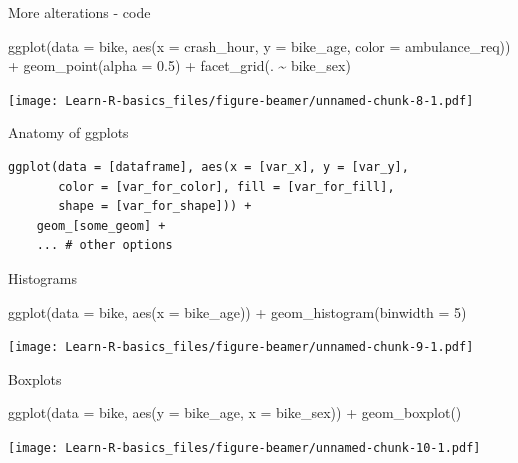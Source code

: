 \documentclass[
  ignorenonframetext,
]{beamer}
\newenvironment{Shaded}{\begin{snugshade}}{\end{snugshade}}
\newcommand{\AttributeTok}[1]{\textcolor[rgb]{0.77,0.63,0.00}{#1}}
\newcommand{\DecValTok}[1]{\textcolor[rgb]{0.00,0.00,0.81}{#1}}
\newcommand{\FloatTok}[1]{\textcolor[rgb]{0.00,0.00,0.81}{#1}}
\newcommand{\FunctionTok}[1]{\textcolor[rgb]{0.00,0.00,0.00}{#1}}
\newcommand{\NormalTok}[1]{#1}
\newcommand{\SpecialCharTok}[1]{\textcolor[rgb]{0.00,0.00,0.00}{#1}}
\begin{document}
\begin{frame}[fragile]{More alterations - code}
\protect\hypertarget{more-alterations---code}{}
\begin{Shaded}
\begin{Highlighting}[]
\FunctionTok{ggplot}\NormalTok{(}\AttributeTok{data =}\NormalTok{ bike, }\FunctionTok{aes}\NormalTok{(}\AttributeTok{x =}\NormalTok{ crash\_hour, }\AttributeTok{y =}\NormalTok{ bike\_age, }\AttributeTok{color =}\NormalTok{ ambulance\_req)) }\SpecialCharTok{+}
  \FunctionTok{geom\_point}\NormalTok{(}\AttributeTok{alpha =} \FloatTok{0.5}\NormalTok{) }\SpecialCharTok{+}
  \FunctionTok{facet\_grid}\NormalTok{(. }\SpecialCharTok{\textasciitilde{}}\NormalTok{ bike\_sex)}
\end{Highlighting}
\end{Shaded}

\texttt{[image: Learn-R-basics\_files/figure-beamer/unnamed-chunk-8-1.pdf]}
\end{frame}

\begin{frame}[fragile]{Anatomy of ggplots}
\protect\hypertarget{anatomy-of-ggplots}{}
\begin{verbatim}
ggplot(data = [dataframe], aes(x = [var_x], y = [var_y], 
       color = [var_for_color], fill = [var_for_fill], 
       shape = [var_for_shape])) +
    geom_[some_geom] +
    ... # other options
\end{verbatim}
\end{frame}

\begin{frame}[fragile]{Histograms}
\protect\hypertarget{histograms}{}
\begin{Shaded}
\begin{Highlighting}[]
\FunctionTok{ggplot}\NormalTok{(}\AttributeTok{data =}\NormalTok{ bike, }\FunctionTok{aes}\NormalTok{(}\AttributeTok{x =}\NormalTok{ bike\_age)) }\SpecialCharTok{+}
  \FunctionTok{geom\_histogram}\NormalTok{(}\AttributeTok{binwidth =} \DecValTok{5}\NormalTok{)}
\end{Highlighting}
\end{Shaded}

\texttt{[image: Learn-R-basics\_files/figure-beamer/unnamed-chunk-9-1.pdf]}
\end{frame}

\begin{frame}[fragile]{Boxplots}
\protect\hypertarget{boxplots}{}
\begin{Shaded}
\begin{Highlighting}[]
\FunctionTok{ggplot}\NormalTok{(}\AttributeTok{data =}\NormalTok{ bike, }\FunctionTok{aes}\NormalTok{(}\AttributeTok{y =}\NormalTok{ bike\_age, }\AttributeTok{x =}\NormalTok{ bike\_sex)) }\SpecialCharTok{+}
  \FunctionTok{geom\_boxplot}\NormalTok{()}
\end{Highlighting}
\end{Shaded}

\texttt{[image: Learn-R-basics\_files/figure-beamer/unnamed-chunk-10-1.pdf]}
\end{frame}
\end{document}
